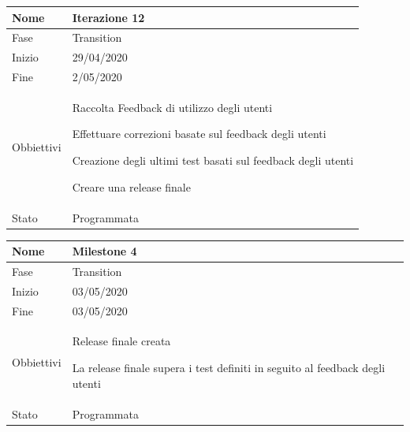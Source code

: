 \begin{center}
\begin{tabular}{ |p{2cm}|p{10cm}|  }
\hline
Nome & Iterazione 12 \\\hline
Fase & Transition \\\hline
Inizio & 29/04/2020 \\\hline
Fine &  2/05/2020  \\\hline
Obbiettivi & 
	\begin{compactitem}
		\item Raccolta Feedback di utilizzo degli utenti
		\item Effettuare correzioni basate sul feedback degli utenti
		\item Creazione degli ultimi test basati sul feedback degli utenti
		\item Creare una release finale
	\end{compactitem}\\\hline
Stato &  Programmata \\\hline
\end{tabular}
\label{table:12}\newline

\begin{tabular}{ |p{2cm}|p{10cm}|  }
\hline
Nome & Milestone 4\\\hline
Fase & Transition \\\hline
Inizio & 03/05/2020 \\\hline
Fine &  03/05/2020 \\\hline
Obbiettivi & 
	\begin{compactitem}
		\item Release finale creata
		\item La release finale supera i test definiti in seguito al feedback degli utenti
	\end{compactitem}\\\hline
Stato &  Programmata \\\hline
\end{tabular}
\label{table:milestone4}\newline


\end{center}

